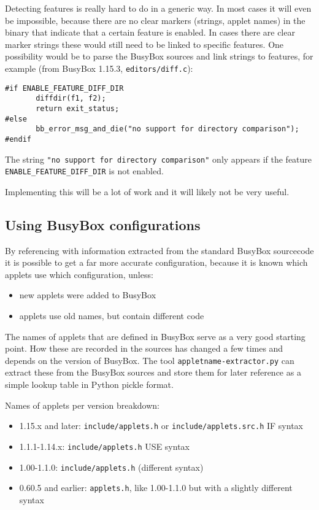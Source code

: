 \documentclass[10pt]{article}
\begin{document}
Detecting features is really hard to do in a generic way. In most cases it will
even be impossible, because there are no clear markers (strings, applet names)
in the binary that indicate that a certain feature is enabled. In cases there
are clear marker strings these would still need to be linked to specific
features. One possibility would be to parse the BusyBox sources and link
strings to features, for example (from BusyBox 1.15.3,
\texttt{editors/diff.c}):

\begin{verbatim}
#if ENABLE_FEATURE_DIFF_DIR
       diffdir(f1, f2);
       return exit_status;
#else
       bb_error_msg_and_die("no support for directory comparison");
#endif
\end{verbatim}

The string \texttt{"no support for directory comparison"} only appears if the
feature \texttt{ENABLE\_FEATURE\_DIFF\_DIR} is not enabled.

Implementing this will be a lot of work and it will likely not be very useful.

\subsection{Using BusyBox configurations}

By referencing with information extracted from the standard BusyBox sourcecode
it is possible to get a far more accurate configuration, because it is known
which applets use which configuration, unless:

\begin{itemize}
\item new applets were added to BusyBox
\item applets use old names, but contain different code
\end{itemize}

The names of applets that are defined in BusyBox serve as a very good starting
point. How these are recorded in the sources has changed a few times and
depends on the version of BusyBox. The tool \texttt{appletname-extractor.py}
can extract these from the BusyBox sources and store them for later reference
as a simple lookup table in Python pickle format.

Names of applets per version breakdown:

\begin{itemize}
\item 1.15.x and later: \texttt{include/applets.h} or
\texttt{include/applets.src.h} IF syntax
\item 1.1.1-1.14.x: \texttt{include/applets.h} USE syntax
\item 1.00-1.1.0: \texttt{include/applets.h} (different syntax)
\item 0.60.5 and earlier: \texttt{applets.h}, like 1.00-1.1.0 but with a
slightly different syntax
\end{itemize}
\end{document}
